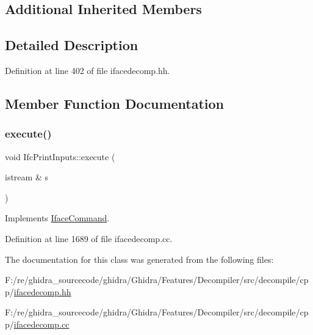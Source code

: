 \subsection*{Additional Inherited Members}


\subsection{Detailed Description}


Definition at line 402 of file ifacedecomp.\+hh.



\subsection{Member Function Documentation}
\mbox{\label{class_ifc_print_inputs_af7467e8aed2fa56fb8e909461e022842}} 
\subsubsection{\texorpdfstring{execute()}{execute()}}
{\footnotesize\ttfamily void Ifc\+Print\+Inputs\+::execute (\begin{DoxyParamCaption}\item[{istream \&}]{s }\end{DoxyParamCaption})\hspace{0.3cm}{\ttfamily [virtual]}}



Implements \mbox{\hyperlink{class_iface_command_af10e29cee2c8e419de6efe9e680ad201}{Iface\+Command}}.



Definition at line 1689 of file ifacedecomp.\+cc.



The documentation for this class was generated from the following files\+:\begin{DoxyCompactItemize}
\item 
F\+:/re/ghidra\+\_\+sourcecode/ghidra/\+Ghidra/\+Features/\+Decompiler/src/decompile/cpp/\mbox{\hyperlink{ifacedecomp_8hh}{ifacedecomp.\+hh}}\item 
F\+:/re/ghidra\+\_\+sourcecode/ghidra/\+Ghidra/\+Features/\+Decompiler/src/decompile/cpp/\mbox{\hyperlink{ifacedecomp_8cc}{ifacedecomp.\+cc}}\end{DoxyCompactItemize}
